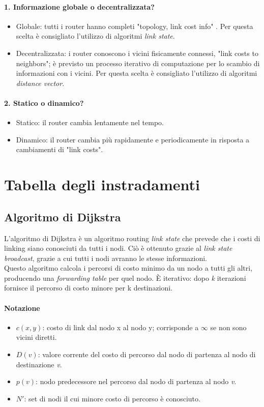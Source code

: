 \paragraph{1. Informazione globale o decentralizzata?}
\begin{itemize}
	\item Globale: tutti i router hanno completi "topology, link cost info"%
	. Per questa scelta è consigliato l'utilizzo di algoritmi \textit{link state}.
	\item Decentralizzata: i router conoscono i vicini fisicamente connessi, "link costs to neighbors"; è previsto un processo iterativo di computazione per lo scambio di informazioni con i vicini. Per questa scelta è consigliato l'utilizzo di algoritmi \textit{distance vector}.	
\end{itemize}

\paragraph{2. Statico o dinamico?}
\begin{itemize}
	\item Statico: il router cambia lentamente nel tempo.
	\item Dinamico: il router cambia più rapidamente e periodicamente in risposta a cambiamenti di "link costs".
\end{itemize}

\section{Tabella degli instradamenti}
\subsection{Algoritmo di Dijkstra}
L'algoritmo di Dijkstra è un algoritmo routing \textit{link state} che prevede che i costi di linking siano conosciuti da tutti i nodi. Ciò è ottenuto grazie al \textit{link state broadcast}, grazie a cui tutti i nodi avranno le stesse informazioni.\\
Questo algoritmo calcola i percorsi di costo minimo da un nodo a tutti gli altri, producendo una \textit{forwarding table} per quel nodo. È iterativo: dopo \textit{k} iterazioni fornisce il percorso di costo minore per k destinazioni.
\paragraph{Notazione}
\begin{itemize}
	\item $ c(x,y) $: costo di link dal nodo x al nodo y; corrisponde a $ \infty $ se non sono vicini diretti.
	\item  $ D(v) $: valore corrente del costo di percorso dal nodo di partenza al nodo di destinazione \textit{v}.
	\item  $ p(v) $: nodo predecessore nel percorso dal nodo di partenza al nodo \textit{v}.
	\item  $ N' $: set di nodi il cui minore costo di percorso è conosciuto.
\end{itemize}

